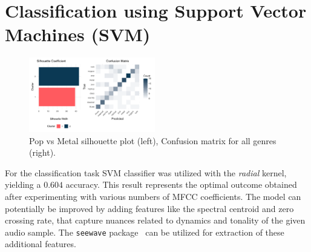 \documentclass[twocolumn]{article}
\begin{document}
\section{Classification using Support Vector Machines (SVM)}
\begin{figure}[hht]
	\centering
	\includegraphics[width=0.49\textwidth]{images/clust_class.pdf}
  \caption{Pop vs Metal silhouette plot (left), Confusion matrix for all genres (right).}
	\label{fig:corr}
\end{figure}
For the classification task SVM classifier was utilized with the \textit{radial} kernel, yielding a $0.604$ accuracy. This result represents the optimal outcome obtained after experimenting with various numbers of MFCC coefficients. The model can potentially be improved by adding features like the spectral centroid and zero crossing rate, that capture nuances related to dynamics and tonality of the given audio sample. The \texttt{seewave} package~\cite{seewave} can be utilized for extraction of these additional features.

\end{document}
